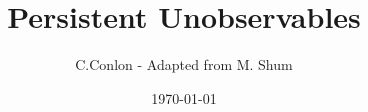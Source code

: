 

\title [Single-agent dynamic optimization models]{Persistent Unobservables}
\author{C.Conlon - Adapted from M. Shum}
\date{\today}



\begin{frame}
\titlepage
\end{frame}


%
%
%


